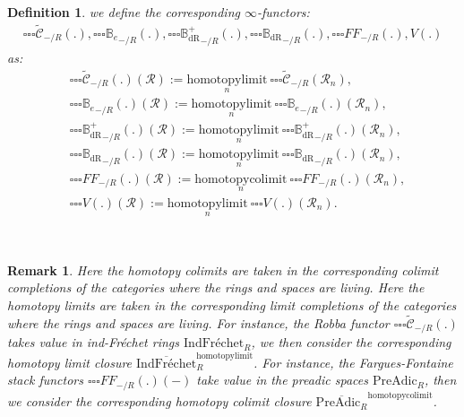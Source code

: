\documentclass[12pt]{book}
\newtheorem{remark}{Remark}
\newtheorem{definition}{Definition}
\begin{document}
\begin{definition}
we define the corresponding $\infty$-functors:
\begin{align}
{\square\square\square}\widetilde{\mathcal{C}}_{-/R}(.),{\square\square\square}{\mathbb{B}_e}_{-/R}(.),{\square\square\square}{\mathbb{B}_\mathrm{dR}^+}_{-/R}(.),{\square\square\square}{\mathbb{B}_\mathrm{dR}}_{-/R}(.),{\square\square\square}{FF}_{-/R}(.),V(.)	
\end{align}
as:
\begin{align}
&{\square\square\square}\widetilde{\mathcal{C}}_{-/R}(.)(\mathcal{R}):=\underset{n}{\mathrm{homotopylimit}}~{\square\square\square}\widetilde{\mathcal{C}}_{-/R}(\mathcal{R}_n),\\
&{\square\square\square}{\mathbb{B}_e}_{-/R}(.)(\mathcal{R}):=\underset{n}{\mathrm{homotopylimit}}~{\square\square\square}{\mathbb{B}_e}_{-/R}(.)(\mathcal{R}_n),\\
&{\square\square\square}{\mathbb{B}_\mathrm{dR}^+}_{-/R}(.)(\mathcal{R}):=\underset{n}{\mathrm{homotopylimit}}~{\square\square\square}{\mathbb{B}_\mathrm{dR}^+}_{-/R}(.)(\mathcal{R}_n),\\
&{\square\square\square}{\mathbb{B}_\mathrm{dR}}_{-/R}(.)(\mathcal{R}):=\underset{n}{\mathrm{homotopylimit}}~{\square\square\square}{\mathbb{B}_\mathrm{dR}}_{-/R}(.)(\mathcal{R}_n),\\
&{\square\square\square}{{FF}}_{-/R}(.)(\mathcal{R}):=\underset{n}{\mathrm{homotopycolimit}}~{\square\square\square}{{FF}}_{-/R}(.)(\mathcal{R}_n),\\	
&{\square\square\square}V(.)(\mathcal{R}):=\underset{n}{\mathrm{homotopylimit}}~{\square\square\square}V(.)(\mathcal{R}_n).
\end{align}
\end{definition}

\

\begin{remark}
Here the homotopy colimits are taken in the corresponding colimit completions of the categories where the rings and spaces are living. Here the homotopy limits are taken in the corresponding limit completions of the categories where the rings and spaces are living. For instance, the Robba functor ${\square\square\square}\widetilde{\mathcal{C}}_{-/R}(.)$ takes value in ind-Fr\'echet rings $\mathrm{Ind}\text{Fr\'echet}_R$, we then consider the corresponding homotopy limit closure $\overline{\mathrm{Ind}\text{Fr\'echet}}^{\mathrm{homotopylimit}}_R$. For instance, the Fargues-Fontaine stack functors ${\square\square\square}{{FF}}_{-/R}(.)(-)$ take value in the preadic spaces $\mathrm{PreAdic}_R$, then we consider the corresponding homotopy colimit closure $\overline{\mathrm{PreAdic}_R}^{\mathrm{homotopycolimit}}$. 	
\end{remark}
\end{document}
